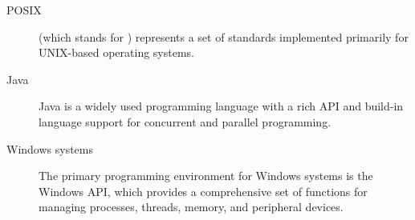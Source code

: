 {{        \begin{description}
            \item[POSIX]  (which stands for ) represents a set of standards implemented primarily for UNIX-based operating systems.
            \item[Java] Java is a widely used programming language with a rich API and build-in language support for concurrent and parallel programming.
            \item[Windows systems] The primary programming environment for Windows systems is the Windows API, which provides a comprehensive set of functions for managing processes, threads, memory, and peripheral devices.
        \end{description}
    }
}
